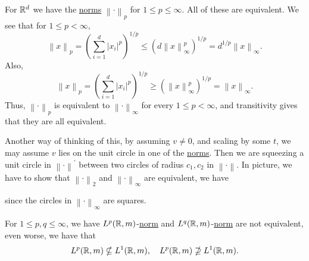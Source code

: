 \begin{eg}
	For \(\mathbb{\MakeUppercase{r}} ^d\) we have the \hyperref[def:norm]{norms} \(\left\lVert \cdot\right\rVert _p\) for \(1\leq p\leq \infty \). All of these are equivalent. We see that for \(1\leq p<\infty \),
	\[
		\left\lVert x\right\rVert _p = \left(\sum\limits_{i=1}^{d} \left\vert x_{i}  \right\vert^p \right)^{1 / p} \leq (d \left\lVert x\right\rVert _\infty ^p)^{1 / p} = d^{1 / p} \left\lVert x\right\rVert _\infty .
	\]
	Also,
	\[
		\left\lVert x\right\rVert _p = \left(\sum\limits_{i=1}^{d} \left\vert x_{i} \right\vert^p \right)^{1 / p} \geq \left(\left\lVert x\right\rVert ^p _\infty \right)^{1 / p} = \left\lVert x\right\rVert _\infty .
	\]
	Thus, \(\left\lVert \cdot\right\rVert _p\) is equivalent to \(\left\lVert \cdot\right\rVert _\infty \) for every \(1 \leq p < \infty \), and transitivity gives that they are all equivalent.

	Another way of thinking of this, by assuming \(v\neq 0\), and scaling by some \(t\), we may assume \(v\) lies on the unit circle in one of the \hyperref[def:norm]{norms}. Then we are squeezing a unit circle
	in \(\left\lVert \cdot\right\rVert ^\prime \) between two circles of radius \(c_1, c_2\) in \(\left\lVert \cdot\right\rVert \). In picture, we have to show that \(\left\lVert \cdot\right\rVert _2\) and
	\(\left\lVert \cdot\right\rVert _\infty \) are equivalent, we have
	\begin{figure}[H]
		\centering
	\end{figure}
	since the circles in \(\left\lVert \cdot\right\rVert _\infty \) are squares.
\end{eg}

\begin{eg}
	For \(1\leq p, q\leq \infty \), we have \(L^p(\mathbb{\MakeUppercase{r}} , m)\)-\hyperref[def:norm]{norm} and \(L^q(\mathbb{\MakeUppercase{r}} , m)\)-\hyperref[def:norm]{norm} are not equivalent, even worse,
	we have that
	\[
		L^p(\mathbb{\MakeUppercase{r}} , m)\nsubseteq L^1(\mathbb{\MakeUppercase{r}} , m),\quad L^p(\mathbb{\MakeUppercase{r}} , m)\nsupseteq L^1(\mathbb{\MakeUppercase{r}} , m).
	\]
\end{eg}